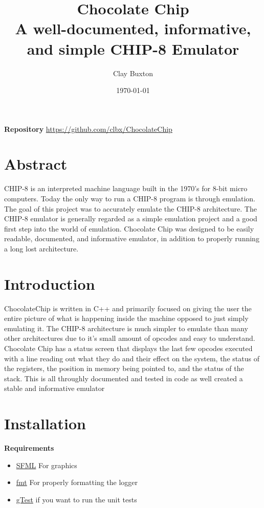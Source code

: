 \documentclass[12pt]{IEEEtran}
\author{Clay Buxton}
\title{%
Chocolate Chip \\
\large A well-documented, informative, and simple CHIP-8 Emulator}
\date{\today}
\begin{document}
\maketitle

\textbf{Repository} \href{https://github.com/clbx/ChocolateChip}{https://github.com/clbx/ChocolateChip}

\section{Abstract}
CHIP-8 is an interpreted machine language built in the 1970's for 8-bit
micro computers. Today the only way to run a CHIP-8 program is through emulation.
The goal of this project was to accurately emulate the CHIP-8 architecture. 
The CHIP-8 emulator is generally regarded as a simple emulation project and a good first step into 
the world of emulation. Chocolate Chip was designed to be easily readable, documented, and informative emulator,
in addition to properly running a long lost architecture.

\section{Introduction}
ChocolateChip is written in C++ and primarily focused on giving the user the entire picture of what is happening inside
the machine opposed to just simply emulating it. The CHIP-8 architecture is much simpler to emulate than many other architectures due
to it's small amount of opcodes and easy to understand. Chocolate Chip has a status screen that displays the last few opcodes 
executed with a line reading out what they do and their effect on the system, the status of the registers, the position in memory being pointed to, and the status of the stack.
This is all throughly documented and tested in code as well created a stable and informative emulator

\section{Installation}

\textbf{Requirements}
\begin{itemize}
    \item \href{https://www.sfml-dev.org}{SFML} For graphics
    \item \href{http://fmtlib.net/latest/index.html}{fmt} For properly formatting the logger
    \item \href {https://github.com/google/googletest}{gTest} if you want to run the unit tests
\end{itemize}
\end{document}
